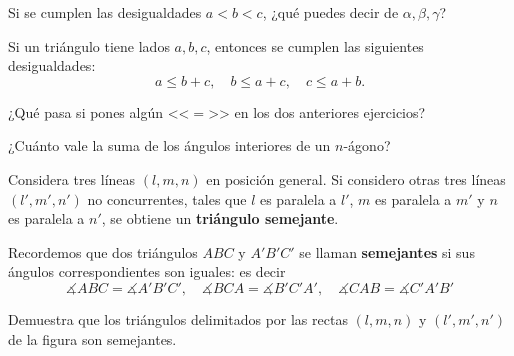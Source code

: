 \begin{figure}[h]
\begin{subfigure}{.55\textwidth}
      \caption{}
\end{subfigure}
      \caption{}
\end{figure}

\begin{ejercicio}
Si se cumplen las desigualdades $a<b<c$, ¿qué puedes decir de $\alpha, \beta, \gamma$?
\end{ejercicio}

\begin{teorema}
Si un triángulo tiene lados $a,b,c$, entonces se cumplen las siguientes desigualdades: $$a\leq b+c,\quad b\leq a+c ,\quad c\leq a+b.$$
\end{teorema}

\begin{ejercicio}
¿Qué pasa si pones algún <<$=$>> en los dos anteriores ejercicios?
\end{ejercicio}

\begin{ejercicio}
¿Cuánto vale la suma de los ángulos interiores de un $n$-ágono?
\end{ejercicio}

Considera tres líneas  $(l, m, n)$ en posición general.
Si considero otras tres líneas $(l', m', n')$ no concurrentes, tales que $l$ es paralela a $l'$, $m$ es paralela a $m'$ y $n$ es paralela a $n'$, se obtiene un {\bf triángulo semejante}.

Recordemos que dos triángulos $ABC$ y $A'B'C'$ se llaman {\bf semejantes} si sus ángulos correspondientes son iguales: es decir $$\measuredangle ABC=\measuredangle A'B'C',\quad \measuredangle BCA=\measuredangle B'C'A', \quad \measuredangle CAB=\measuredangle C'A'B'$$

\begin{ejercicio}
Demuestra que los triángulos delimitados por las rectas $(l,m,n)$ y $(l',m',n')$ de la figura son semejantes.
\end{ejercicio}

